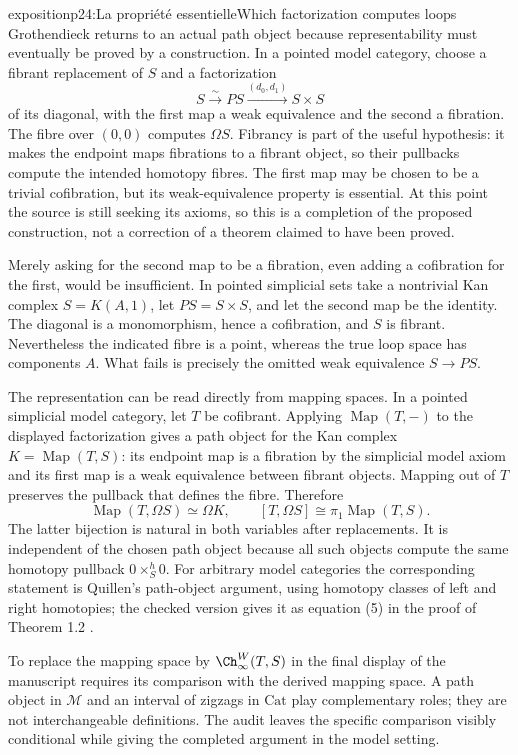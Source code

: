 \begin{dcomment}{exposition}{p24:La propriété essentielle}{Which factorization computes loops}
Grothendieck returns to an actual path object because representability must eventually be proved by a construction. In a pointed model category, choose a fibrant replacement of $S$ and a factorization
\[
 S\xrightarrow{\sim}P S\xrightarrow{(d_0,d_1)}S\times S
\]
of its diagonal, with the first map a weak equivalence and the second a fibration. The fibre over $(0,0)$ computes $\Omega S$. Fibrancy is part of the useful hypothesis: it makes the endpoint maps fibrations to a fibrant object, so their pullbacks compute the intended homotopy fibres. The first map may be chosen to be a trivial cofibration, but its weak-equivalence property is essential. At this point the source is still seeking its axioms, so this is a completion of the proposed construction, not a correction of a theorem claimed to have been proved.

Merely asking for the second map to be a fibration, even adding a cofibration for the first, would be insufficient. In pointed simplicial sets take a nontrivial Kan complex $S=K(A,1)$, let $P S=S\times S$, and let the second map be the identity. The diagonal is a monomorphism, hence a cofibration, and $S$ is fibrant. Nevertheless the indicated fibre is a point, whereas the true loop space has components $A$. What fails is precisely the omitted weak equivalence $S\to P S$.

The representation can be read directly from mapping spaces. In a pointed simplicial model category, let $T$ be cofibrant. Applying $\operatorname{Map}(T,-)$ to the displayed factorization gives a path object for the Kan complex $K=\operatorname{Map}(T,S)$: its endpoint map is a fibration by the simplicial model axiom and its first map is a weak equivalence between fibrant objects. Mapping out of $T$ preserves the pullback that defines the fibre. Therefore
\[
 \operatorname{Map}(T,\Omega S)\simeq\Omega K,
 \qquad
 [T,\Omega S]\cong\pi_1\operatorname{Map}(T,S).
\]
The latter bijection is natural in both variables after replacements. It is independent of the chosen path object because all such objects compute the same homotopy pullback $0\times_S^h0$. For arbitrary model categories the corresponding statement is Quillen's path-object argument, using homotopy classes of left and right homotopies; the checked version gives it as equation (5) in the proof of Theorem 1.2 \citep[Chapter I, \S2]{Quillen1967}.

To replace the mapping space by $\Ch_\infty^W(T,S)$ in the final display of the manuscript requires its comparison with the derived mapping space. A path object in $\mathcal M$ and an interval of zigzags in $\mathrm{Cat}$ play complementary roles; they are not interchangeable definitions. The audit leaves the specific comparison visibly conditional while giving the completed argument in the model setting.
\end{dcomment}


